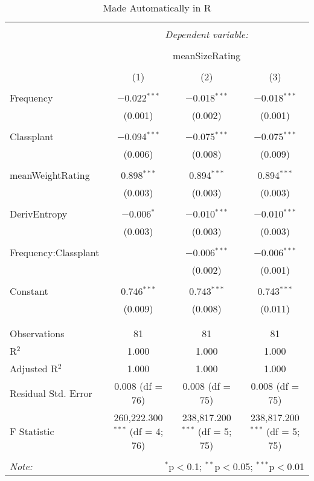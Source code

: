 
\begin{table}[!htbp] \centering 
  \caption{Made Automatically in R} 
  \label{} 
\begin{tabular}{@{\extracolsep{5pt}}lccc} 
\\[-1.8ex]\hline 
\hline \\[-1.8ex] 
 & \multicolumn{3}{c}{\textit{Dependent variable:}} \\ 
\cline{2-4} 
\\[-1.8ex] & \multicolumn{3}{c}{meanSizeRating} \\ 
\\[-1.8ex] & (1) & (2) & (3)\\ 
\hline \\[-1.8ex] 
 Frequency & $-$0.022$^{***}$ & $-$0.018$^{***}$ & $-$0.018$^{***}$ \\ 
  & (0.001) & (0.002) & (0.001) \\ 
  & & & \\ 
 Classplant & $-$0.094$^{***}$ & $-$0.075$^{***}$ & $-$0.075$^{***}$ \\ 
  & (0.006) & (0.008) & (0.009) \\ 
  & & & \\ 
 meanWeightRating & 0.898$^{***}$ & 0.894$^{***}$ & 0.894$^{***}$ \\ 
  & (0.003) & (0.003) & (0.003) \\ 
  & & & \\ 
 DerivEntropy & $-$0.006$^{*}$ & $-$0.010$^{***}$ & $-$0.010$^{***}$ \\ 
  & (0.003) & (0.003) & (0.003) \\ 
  & & & \\ 
 Frequency:Classplant &  & $-$0.006$^{***}$ & $-$0.006$^{***}$ \\ 
  &  & (0.002) & (0.001) \\ 
  & & & \\ 
 Constant & 0.746$^{***}$ & 0.743$^{***}$ & 0.743$^{***}$ \\ 
  & (0.009) & (0.008) & (0.011) \\ 
  & & & \\ 
\hline \\[-1.8ex] 
Observations & 81 & 81 & 81 \\ 
R$^{2}$ & 1.000 & 1.000 & 1.000 \\ 
Adjusted R$^{2}$ & 1.000 & 1.000 & 1.000 \\ 
Residual Std. Error & 0.008 (df = 76) & 0.008 (df = 75) & 0.008 (df = 75) \\ 
F Statistic & 260,222.300$^{***}$ (df = 4; 76) & 238,817.200$^{***}$ (df = 5; 75) & 238,817.200$^{***}$ (df = 5; 75) \\ 
\hline 
\hline \\[-1.8ex] 
\textit{Note:}  & \multicolumn{3}{r}{$^{*}$p$<$0.1; $^{**}$p$<$0.05; $^{***}$p$<$0.01} \\ 
\end{tabular} 
\end{table} 
